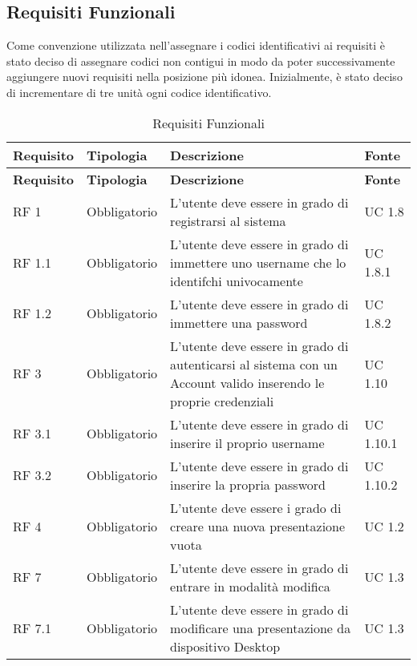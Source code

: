 \subsection{Requisiti Funzionali}{
	Come convenzione utilizzata nell'assegnare i codici identificativi ai requisiti è stato deciso di assegnare codici non contigui in modo da poter successivamente aggiungere nuovi requisiti nella posizione più idonea. Inizialmente, è stato deciso di incrementare di tre unità ogni codice identificativo.\\
	\renewcommand*{\arraystretch}{1.4}
	\begin{longtable} [c]{| p{2.5cm} | p{2.5cm} | p{6cm} |p{2.5cm}|}
		\caption{Requisiti Funzionali \label{tab:reqFunzionali}}\\
	 \hline
	 \textbf{Requisito} & \textbf{Tipologia} & \textbf{Descrizione} & \textbf{Fonte} \\
	 \hline
	 \endfirsthead
	 \hline
	 \textbf{Requisito} & \textbf{Tipologia} & \textbf{Descrizione} & \textbf{Fonte} \\
	 \hline
			\endhead
	 \hline
	 \endfoot
	 \hline
	 \endlastfoot
		RF 1 & Obbligatorio & L'utente deve essere in grado di registrarsi al sistema & UC 1.8\\
		\hline
		RF 1.1 & Obbligatorio & L'utente deve essere in grado di immettere uno username che lo identifchi univocamente & UC 1.8.1\\
		\hline
		RF 1.2 & Obbligatorio & L'utente deve essere in grado di immettere una password & UC 1.8.2\\
		\hline
		RF 3 & Obbligatorio & L'utente deve essere in grado di autenticarsi al sistema con un Account\ped{g} valido inserendo le proprie credenziali & UC 1.10\\
		\hline
		RF 3.1 & Obbligatorio & L'utente deve essere in grado di inserire il proprio username & UC 1.10.1\\		
		\hline
		RF 3.2 & Obbligatorio & L'utente deve essere in grado di inserire la propria password & UC 1.10.2\\
		\hline
		RF 4 & Obbligatorio & L’utente deve essere i grado di creare una nuova presentazione vuota & UC 1.2\\
		\hline	
		RF 7 & Obbligatorio & L'utente deve essere in grado di entrare in modalità modifica & UC 1.3\\
		\hline
		RF 7.1 & Obbligatorio & L'utente deve essere in grado di modificare una presentazione da dispositivo Desktop\ped{g} & UC 1.3\\						

\end{longtable}}
